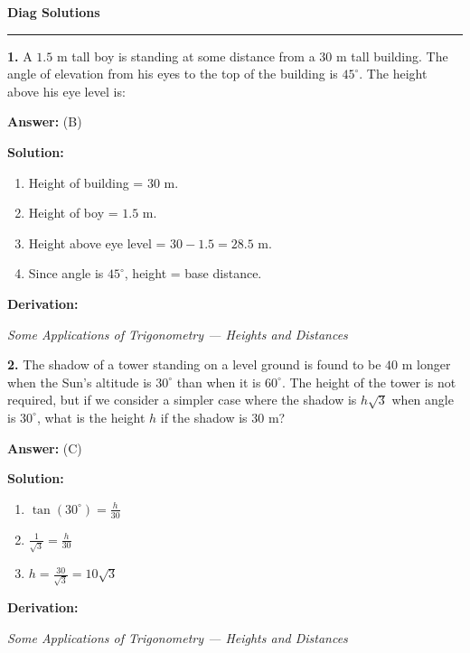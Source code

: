 \documentclass[12pt,a4paper]{exam}
\newcommand{\fitmath}[1]{%
  \sbox{\schmathbox}{$\displaystyle #1$}%
  \ifdim\wd\schmathbox>\linewidth
    \resizebox{\linewidth}{!}{\usebox{\schmathbox}}%
  \else
    \usebox{\schmathbox}%
  \fi}
\begin{document}
\thispagestyle{empty}
\begin{center}
  \textbf{\LARGE Diag Solutions} \\[0.3cm]
  \rule{\textwidth}{0.5pt}
\end{center}

\vspace{0.3cm}

\begin{questions}
\question \textbf{1.} A $1.5$ m tall boy is standing at some distance from a $30$ m tall building. The angle of elevation from his eyes to the top of the building is $45^\circ$. The height above his eye level is:

\textbf{Answer:}
(B)

\textbf{Solution:}
\begin{enumerate}
  \item Height of building = $30$ m.
  \item Height of boy = $1.5$ m.
  \item Height above eye level = $30 - 1.5 = 28.5$ m.
  \item Since angle is $45^\circ$, height = base distance.
\end{enumerate}
\textbf{Derivation:}
\begin{center}
\fitmath{h = 30 - 1.5 = 28.5 \text{ m}}
\end{center}
\hfill \textit{Some Applications of Trigonometry — Heights and Distances}
\vspace{0.3cm}

\question \textbf{2.} The shadow of a tower standing on a level ground is found to be $40$ m longer when the Sun's altitude is $30^\circ$ than when it is $60^\circ$. The height of the tower is not required, but if we consider a simpler case where the shadow is $h\sqrt{3}$ when angle is $30^\circ$, what is the height $h$ if the shadow is $30$ m?

\textbf{Answer:}
(C)

\textbf{Solution:}
\begin{enumerate}
  \item $\tan(30^\circ) = \frac{h}{30}$
  \item $\frac{1}{\sqrt{3}} = \frac{h}{30}$
  \item $h = \frac{30}{\sqrt{3}} = 10\sqrt{3}$
\end{enumerate}
\textbf{Derivation:}
\begin{center}
\fitmath{h = 30 \times \tan(30^\circ) = 30 \times \frac{1}{\sqrt{3}} = 10\sqrt{3}}
\end{center}
\hfill \textit{Some Applications of Trigonometry — Heights and Distances}
\vspace{0.3cm}


\end{questions}
\end{document}
